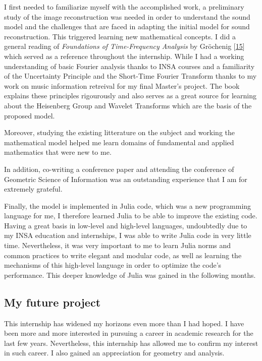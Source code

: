 \documentclass[
  american,
]{article}
\begin{document}
I first needed to familiarize myself with the accomplished work,
a preliminary study of the image reconstruction was needed
in order to understand the sound model and the challenges that are
faced in adapting the initial model for sound reconstruction.
This triggered learning new mathematical concepts.
I did a general reading of \emph{Foundations of Time-Frequency Analysis} by Gröchenig {[}\protect\hyperlink{ref-grochenig2001}{15}{]}
which served as a reference throughout the internship.
While I had a working understanding of basic Fourier analysis thanks to INSA courses
and a familiarity of the Uncertainty Principle and the Short-Time Fourier Transform
thanks to my work on music information retreival for my final Master's project.
The book explains these principles rigourously and also serves as a great source
for learning about the Heisenberg Group and Wavelet Transforms which are the basis
of the proposed model.

Moreover, studying the existing litterature on the subject and working
the mathematical model helped me learn domains
of fundamental and applied mathematics that were new to me.

In addition, co-writing a conference paper and attending the conference
of Geometric Science of Information was an outstanding experience
that I am for extremely grateful.

Finally, the model is implemented in Julia code, which was a new programming language for me,
I therefore learned Julia to be able to improve the existing code.
Having a great basis in low-level and high-level languages,
undoubtedly due to my INSA education and internships,
I was able to write Julia code in very little time.
Nevertheless, it was very important to me to learn
Julia norms and common practices to write elegant and modular code,
as well as learning the mechanisms of this high-level language
in order to optimize the code's performance.
This deeper knowledge of Julia was gained in the following months.

\hypertarget{my-future-project}{%
\subsection{My future project}\label{my-future-project}}

This internship has widened my horizons even more than I had hoped.
I have been more and more interested in pursuing a career in academic research
for the last few years.
Nevertheless, this internship has allowed me to confirm my interest
in such career.
I also gained an appreciation for geometry and analysis.
\end{document}
